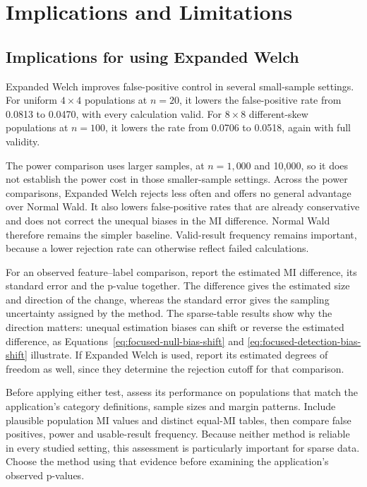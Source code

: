 \chapter{Implications and Limitations}
\label{chap:discussion}

\section{Implications for using Expanded Welch}

Expanded Welch improves false-positive control in several small-sample
settings. For uniform \(4\times4\) populations at \(n=20\), it lowers
the false-positive rate from 0.0813 to 0.0470, with every calculation valid.
For \(8\times8\) different-skew populations at \(n=100\), it lowers the
rate from 0.0706 to 0.0518, again with full validity.

The power comparison uses larger samples, at \(n=1{,}000\) and 10,000,
so it does not establish the power cost in those smaller-sample settings.
Across the power comparisons, Expanded Welch rejects less often and offers
no general advantage over Normal Wald. It also lowers false-positive rates
that are already conservative and does not correct the unequal biases in
the MI difference. Normal Wald therefore remains the simpler
baseline. Valid-result frequency remains important, because a lower
rejection rate can otherwise reflect failed calculations.

For an observed feature--label comparison, report the estimated MI
difference, its standard error and the p-value together. The difference
gives the estimated size and direction of the change, whereas the standard error
gives the sampling uncertainty assigned by the method. The sparse-table
results show why the direction matters: unequal estimation biases can
shift or reverse the estimated difference, as
Equations~\eqref{eq:focused-null-bias-shift} and
\eqref{eq:focused-detection-bias-shift} illustrate. If Expanded
Welch is used, report its estimated degrees of freedom as well, since
they determine the rejection cutoff for that comparison.

Before applying either test, assess its performance on populations that
match the application's category definitions, sample sizes and margin
patterns. Include plausible population MI values and distinct equal-MI
tables, then compare false positives, power and usable-result frequency.
Because neither method is reliable in every studied setting, this
assessment is particularly important for sparse data. Choose the method using
that evidence before examining the application's observed p-values.

